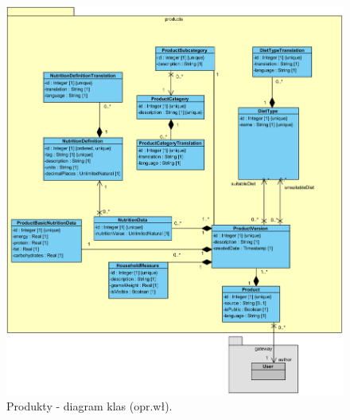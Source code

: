 \begin{minipage}{\textwidth}
    \begin{figure}[H]
        \centering\includegraphics[scale=0.7]{../uml/class_diagrams/products.png}
        \caption{Produkty - diagram klas (opr.wł).}\label{rysunek:class-diagram-products}
    \end{figure}
\end{minipage}

